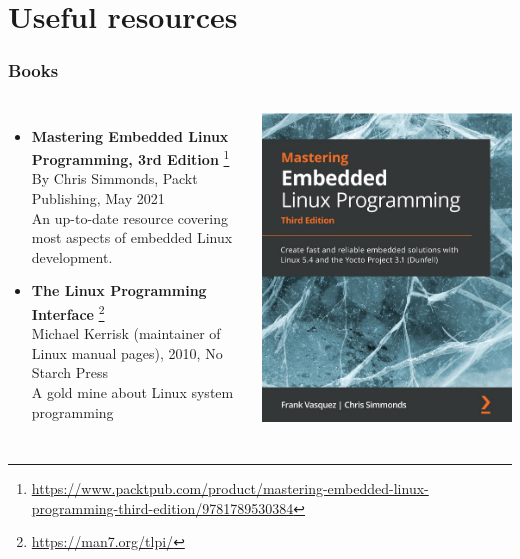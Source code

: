 \section{Useful resources}

\begin{frame}
  \frametitle{Books}
  \begin{columns}
    \small
    \begin{itemize}
    \item {\bf Mastering Embedded Linux Programming, 3rd Edition}
      \footnote{\tiny
\url{https://www.packtpub.com/product/mastering-embedded-linux-programming-third-edition/9781789530384}}\\
      By Chris Simmonds, Packt Publishing, May 2021\\
      An up-to-date resource covering most aspects of embedded Linux
      development.
    \item {\bf The Linux Programming Interface}
      \footnote{\tiny \url{https://man7.org/tlpi/}}\\
      Michael Kerrisk (maintainer of Linux manual pages), 2010, No Starch Press\\
      A gold mine about Linux system programming\\
    \end{itemize}
    \normalsize
    \includegraphics[height=0.25\textheight]{slides/sysdev-references/book-mastering-embedded-linux3.jpg}\\

\end{columns}
\end{frame}
